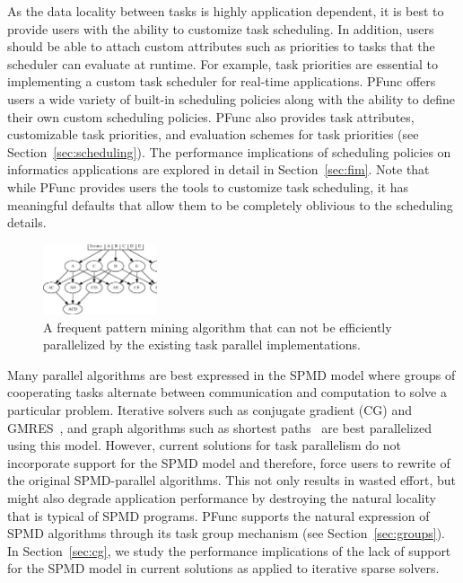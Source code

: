 \documentclass{sig-alternate}
\begin{document}
As the data locality between tasks is highly application dependent, it is best
to provide users with the ability to customize task scheduling. 
%
In addition, users should be able to attach custom attributes such as
priorities to tasks that the scheduler can evaluate at runtime.  For example,
task priorities are essential to implementing a custom task scheduler for
real-time applications. PFunc offers users a wide variety of built-in scheduling
policies along with the ability to define their own custom scheduling policies. 
%
PFunc also provides task attributes, customizable task priorities, and
evaluation schemes for task priorities (see Section~\ref{sec:scheduling}).  The
performance implications of scheduling policies on informatics applications are
explored in detail in Section~\ref{sec:fim}.  Note that while PFunc
provides users the tools to customize task scheduling, it has
meaningful defaults that allow them to be completely
oblivious to the scheduling details.

\begin{figure}[t]
\centering
\includegraphics[width=0.30\textwidth]{figs/itemset}
\caption{A frequent pattern mining algorithm that can not be efficiently
parallelized by the existing task parallel implementations.}
\label{fig:fim}
\end{figure}
 
Many parallel algorithms are best expressed in the SPMD model where groups of
cooperating tasks alternate between communication and computation to solve a
particular problem.  Iterative solvers such as conjugate gradient (CG) and
GMRES~\cite{saadBook}, and graph algorithms such as shortest
paths~\cite{Meyer03:DeltaStepping} are best parallelized using this model.
However, current solutions for task parallelism do not incorporate support for
the SPMD model and therefore, force users to rewrite of the original SPMD-parallel
algorithms.  This not only results in wasted effort, but might also degrade
application performance by destroying the natural locality that is typical of
SPMD programs.  PFunc supports the natural expression of SPMD algorithms
through its task group mechanism (see Section~\ref{sec:groups}).  In
Section~\ref{sec:cg}, we study the performance implications of the lack of
support for the SPMD model in current solutions as applied
to iterative sparse solvers.
\end{document}
